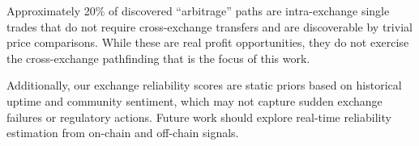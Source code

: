 Approximately 20\% of discovered ``arbitrage'' paths are intra-exchange single trades that do not require cross-exchange transfers and are discoverable by trivial price comparisons. While these are real profit opportunities, they do not exercise the cross-exchange pathfinding that is the focus of this work.

Additionally, our exchange reliability scores are static priors based on historical uptime and community sentiment, which may not capture sudden exchange failures or regulatory actions. Future work should explore real-time reliability estimation from on-chain and off-chain signals.
